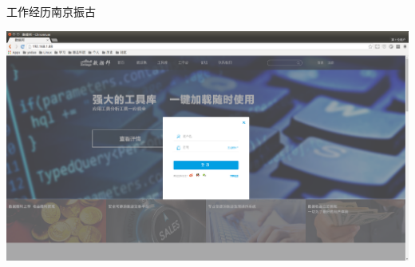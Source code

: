 \documentclass[xcolor=svgnames, t, aspectratio=169]{ctexbeamer}
\begin{document}
\begin{frame}{工作经历}{南京振古}
  \begin{center}
    \includegraphics[scale=0.18]{zettage.png}
  \end{center}
\end{frame}
\end{document}
